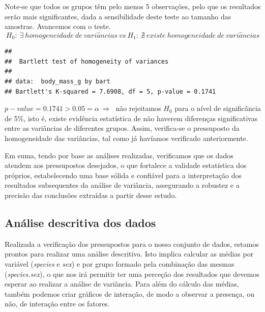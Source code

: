 \documentclass[]{article}
\begin{document}
Note-se que todos os grupos têm pelo menos 5 observações, pelo que os
resultados serão mais significantes, dada a sensibilidade deste teste ao
tamanho das amostras. Avancemos com o teste. \[
H_0:\ \exists\ homogeneidade\ de\ vari\hat{a}ncias\
vs\
H_1:\ \nexists\ existe\ homogeneidade\ de \ vari\hat{a}ncias
\]

\begin{Shaded}
\begin{Highlighting}[]
\SpecialCharTok{\textasciitilde{}}
\end{Highlighting}
\end{Shaded}

\begin{verbatim}
## 
##  Bartlett test of homogeneity of variances
## 
## data:  body_mass_g by bart
## Bartlett's K-squared = 7.6908, df = 5, p-value = 0.1741
\end{verbatim}

\(p-value = 0.1741 > 0.05 = \alpha\ \Rightarrow\ \) não rejeitamos
\(H_0\) para o nível de significância de 5\%, isto é, existe evidência
estatística de não haverem diferenças significativas entre as variâncias
de diferentes grupos. Assim, verifica-se o pressuposto da homogeneidade
das variâncias, tal como já havíamos verificado anteriormente.

\begin{Shaded}
\begin{Highlighting}[]
\end{Highlighting}
\end{Shaded}

Em suma, tendo por base as análises realizadas, verificamos que os dados
atendem aos pressupostos desejados, o que fortalece a validade
estatística dos próprios, estabelecendo uma base sólida e confiável para
a interpretação dos resultados subsequentes da análise de variância,
assegurando a robustez e a precisão das conclusões extraídas a partir
desse estudo.

\subsection{Análise descritiva dos dados}

Realizada a verificação dos pressupostos para o nosso conjunto de dados,
estamos prontos para realizar uma análise descritiva. Isto implica
calcular as médias por variável (\emph{species} e \emph{sex}) e por
grupo formado pela combinação das mesmas (\emph{species.sex}), o que nos
irá permitir ter uma perceção dos resultados que devemos esperar ao
realizar a análise de variância. Para além do cálculo das médias, também
podemos criar gráficos de interação, de modo a observar a presença, ou
não, de interação entre os fatores.
\end{document}
